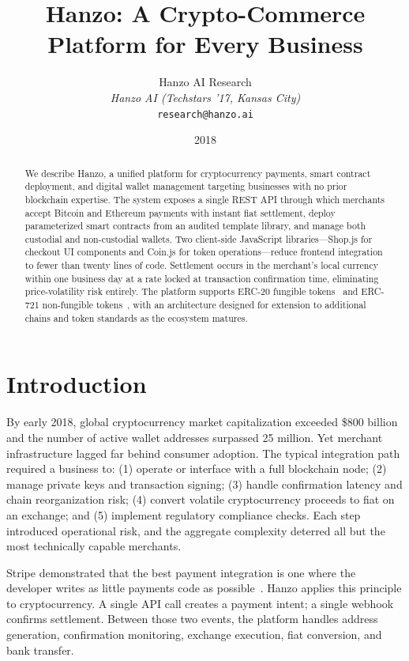 \documentclass[11pt,letterpaper]{article}
\title{Hanzo: A Crypto-Commerce Platform for Every Business}
\author{
    Hanzo AI Research \\
    \textit{Hanzo AI (Techstars '17, Kansas City)} \\
    \texttt{research@hanzo.ai}
}
\date{2018}
\begin{document}
\hanzocoverpage

\maketitle

\begin{abstract}
We describe Hanzo, a unified platform for cryptocurrency payments, smart
contract deployment, and digital wallet management targeting businesses with no
prior blockchain expertise.  The system exposes a single REST API through which
merchants accept Bitcoin and Ethereum payments with instant fiat settlement,
deploy parameterized smart contracts from an audited template library, and
manage both custodial and non-custodial wallets.  Two client-side JavaScript
libraries---Shop.js for checkout UI components and Coin.js for token
operations---reduce frontend integration to fewer than twenty lines of code.
Settlement occurs in the merchant's local currency within one business day at a
rate locked at transaction confirmation time, eliminating price-volatility risk
entirely.  The platform supports ERC-20 fungible tokens~\cite{vogelsteller2015}
and ERC-721 non-fungible tokens~\cite{entriken2018}, with an architecture
designed for extension to additional chains and token standards as the ecosystem
matures.
\end{abstract}

\section{Introduction}
\label{sec:intro}

By early 2018, global cryptocurrency market capitalization exceeded \$800
billion and the number of active wallet addresses surpassed 25 million.  Yet
merchant infrastructure lagged far behind consumer adoption.  The typical
integration path required a business to: (1) operate or interface with a
full blockchain node; (2) manage private keys and transaction signing;
(3) handle confirmation latency and chain reorganization risk; (4) convert
volatile cryptocurrency proceeds to fiat on an exchange; and (5) implement
regulatory compliance checks.  Each step introduced operational risk, and the
aggregate complexity deterred all but the most technically capable merchants.

Stripe demonstrated that the best payment integration is one where the
developer writes as little payments code as possible~\cite{stripe2018}.
Hanzo applies this principle to cryptocurrency.  A single API call creates a
payment intent; a single webhook confirms settlement.  Between those two
events, the platform handles address generation, confirmation monitoring,
exchange execution, fiat conversion, and bank transfer.
\end{document}

